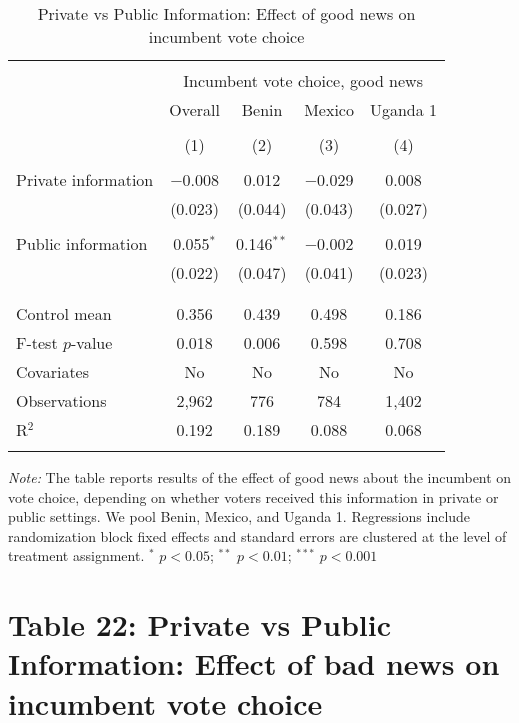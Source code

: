 \documentclass[]{article}
\begin{document}
\begin{table}[htb] \centering 
  \caption{Private vs Public Information: Effect of good news on incumbent vote choice} 
  \label{pvt_pub_good} 
\begin{tabular}{@{\extracolsep{5pt}}lcccc} 
\\[-1.8ex]\hline 
\hline \\[-1.8ex] 
 & \multicolumn{4}{c}{Incumbent vote choice, good news} \\ 
\cline{2-5} 
 & Overall & Benin & Mexico & Uganda 1 \\ 
\\[-1.8ex] & (1) & (2) & (3) & (4)\\ 
\hline \\[-1.8ex] 
 Private information & $-$0.008 & 0.012 & $-$0.029 & 0.008 \\ 
  & (0.023) & (0.044) & (0.043) & (0.027) \\ 
  & & & & \\ 
 Public information & 0.055$^{*}$ & 0.146$^{**}$ & $-$0.002 & 0.019 \\ 
  & (0.022) & (0.047) & (0.041) & (0.023) \\ 
  & & & & \\ 
\hline \\[-1.8ex] 
Control mean & 0.356 & 0.439 & 0.498 & 0.186 \\ 
F-test $p$-value & 0.018 & 0.006 & 0.598 & 0.708 \\ 
Covariates & No & No & No & No \\ 
Observations & 2,962 & 776 & 784 & 1,402 \\ 
R$^{2}$ & 0.192 & 0.189 & 0.088 & 0.068 \\ 
\hline 
\hline \\[-1.8ex] 
\end{tabular} 
\begin{flushleft}\textit{Note:} The table reports results of the effect of good news about the incumbent on vote choice, depending on whether voters received this information in private or public settings. We pool Benin, Mexico, and Uganda 1. Regressions include randomization block fixed effects and standard errors are clustered at the level of treatment assignment. $^*$ $p<0.05$; $^{**}$ $p<0.01$; $^{***}$ $p<0.001$ \end{flushleft}
\end{table}

\clearpage

\section{Table 22: Private vs Public Information: Effect of bad news on
incumbent vote
choice}\label{table-22-private-vs-public-information-effect-of-bad-news-on-incumbent-vote-choice}
\end{document}
